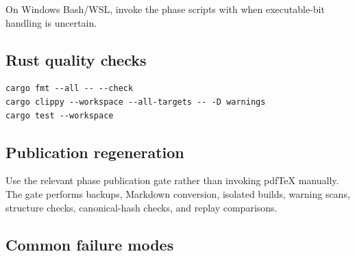 \documentclass[11pt]{article}
\begin{document}
On Windows Bash/WSL, invoke the phase scripts with \texttt{} when executable-bit handling is uncertain.

\subsection{Rust quality checks}

\begin{Verbatim}[fontsize=\small]
cargo fmt --all -- --check
cargo clippy --workspace --all-targets -- -D warnings
cargo test --workspace
\end{Verbatim}

\subsection{Publication regeneration}

Use the relevant phase publication gate rather than invoking pdfTeX manually. The gate performs backups, Markdown conversion, isolated builds, warning scans, structure checks, canonical-hash checks, and replay comparisons.

\subsection{Common failure modes}
\end{document}
